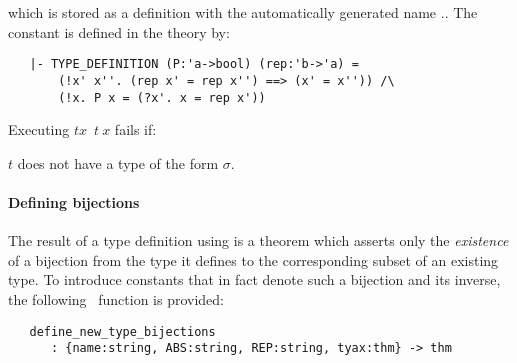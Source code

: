 \noindent which is stored as a definition with the automatically
generated name
.. The constant
is defined in the theory  by:

\begin{hol}
\begin{verbatim}
   |- TYPE_DEFINITION (P:'a->bool) (rep:'b->'a) =
       (!x' x''. (rep x' = rep x'') ==> (x' = x'')) /\
       (!x. P x = (?x'. x = rep x'))
\end{verbatim}
\end{hol}

\noindent Executing $t$$x$\ $t\ x$\ml{)} fails if:
\begin{myenumerate}
\item $t$ does not have a type of the form $\sigma$.
\end{myenumerate}

\paragraph{Defining bijections}

The result of a type definition using \ml{new\_type\_definition} is a theorem
which asserts only the {\it existence\/} of a
bijection
from the type it defines to the corresponding subset of an existing type.  To
introduce constants that in fact denote such a bijection and its inverse, the
following \ML\ function is provided:

\begin{holboxed}
\begin{verbatim}
   define_new_type_bijections
      : {name:string, ABS:string, REP:string, tyax:thm} -> thm
\end{verbatim}\end{holboxed}

